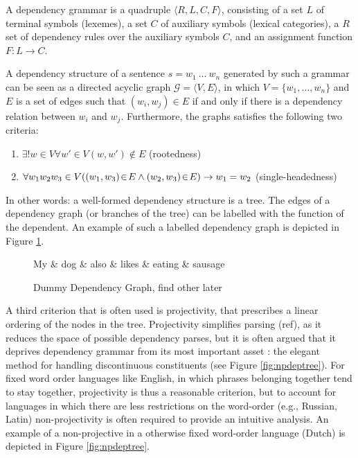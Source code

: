 \documentclass{report}
\theoremstyle{definition}
\theoremstyle{plain}
\begin{document}
A dependency grammar is a quadruple $\langle R,L,C,F\rangle$, consisting of a set $L$ of terminal symbols (lexemes), a set $C$ of auxiliary symbols (lexical categories), a $R$ set of dependency rules over the auxiliary symbols $C$, and an assignment function $F : L\rightarrow C$.\citep{hays1964dependency,gaifman1965dependency}

A dependency structure of a sentence $s = w_1~\ldots~w_n$ generated by such a grammar can be seen as a directed acyclic graph $\mathcal{G} = \langle V, E\rangle$, in which $V = \{w_1, \ldots,w_n\}$ and $E$ is a set of edges such that $(w_i,w_j)\in E$ if and only if there is a dependency relation between $w_i$ and $w_j$. Furthermore, the graphs satisfies the following two criteria:
\begin{enumerate}
\item $\exists! w\in V \forall w'\in V (w,w')\notin E$ (rootedness)
\item $\forall w_1 w_2 w_3 \in V( (w_1,w_3)\negthinspace\in\negthinspace E \land (w_2,w_3)\negthinspace \in\negthinspace E ) \rightarrow w_1 = w_2$ (single-headedness)
\end{enumerate} 

In other words: a well-formed dependency structure is a tree. The edges of a dependency graph (or branches of the tree) can be labelled with the function of the dependent. An example of such a labelled dependency graph is depicted in Figure \ref{fig:depgraph}.

\begin{figure}[!ht]
\centering
\begin{dependency}[theme=simple]%
\begin{deptext}[column sep=.5cm, row sep=.1ex]
My \& dog \& also \& likes \& eating \& sausage \\
\end{deptext}
\end{dependency}
\caption{Dummy Dependency Graph, find other later}\label{fig:depgraph}
\end{figure}

A third criterion that is often used is projectivity, that prescribes a linear ordering of the nodes in the tree. Projectivity simplifies parsing (ref), as it reduces the space of possible dependency parses, but it is often argued that it deprives dependency grammar from its most important asset \citep{covington1990dependency,debusmann2000introduction}: the elegant method for handling discontinuous constituents (see Figure \ref{fig:npdeptree}). For fixed word order languages like English, in which phrases belonging together tend to stay together, projectivity is thus a reasonable criterion, but to account for languages in which there are less restrictions on the word-order (e.g., Russian, Latin) non-projectivity is often required to provide an intuitive analysis. An example of a non-projective in a otherwise fixed word-order language (Dutch) is depicted in Figure \ref{fig:npdeptree}.
\end{document}
